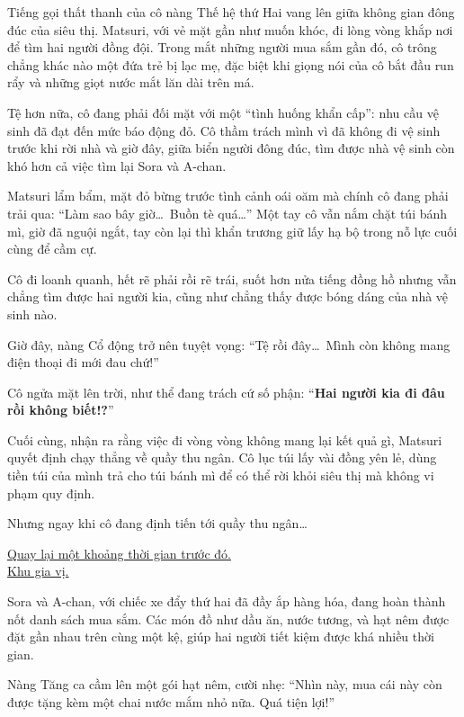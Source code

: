 \documentclass[../main.tex]{subfiles}
\begin{document}
Tiếng gọi thất thanh của cô nàng Thế hệ thứ Hai vang lên giữa không gian đông đúc của siêu thị. Matsuri, với vẻ mặt gần như muốn khóc, đi lòng vòng khắp nơi để tìm hai người đồng đội. Trong mắt những người mua sắm gần đó, cô trông chẳng khác nào một đứa trẻ bị lạc mẹ, đặc biệt khi giọng nói của cô bắt đầu run rẩy và những giọt nước mắt lăn dài trên má.

Tệ hơn nữa, cô đang phải đối mặt với một ``tình huống khẩn cấp'': nhu cầu vệ sinh đã đạt đến mức báo động đỏ. Cô thầm trách mình vì đã không đi vệ sinh trước khi rời nhà và giờ đây, giữa biển người đông đúc, tìm được nhà vệ sinh còn khó hơn cả việc tìm lại Sora và A-chan.

Matsuri lẩm bẩm, mặt đỏ bừng trước tình cảnh oái oăm mà chính cô đang phải trải qua: ``Làm sao bây giờ\dots\ Buồn tè quá\dots'' Một tay cô vẫn nắm chặt túi bánh mì, giờ đã nguội ngắt, tay còn lại thì khẩn trương giữ lấy hạ bộ trong nỗ lực cuối cùng để cầm cự.

Cô đi loanh quanh, hết rẽ phải rồi rẽ trái, suốt hơn nửa tiếng đồng hồ nhưng vẫn chẳng tìm được hai người kia, cũng như chẳng thấy được bóng dáng của nhà vệ sinh nào.

Giờ đây, nàng Cổ động trở nên tuyệt vọng: ``Tệ rồi đây\dots\ Mình còn không mang điện thoại đi mới đau chứ!''

Cô ngửa mặt lên trời, như thể đang trách cứ số phận: ``\textbf{Hai người kia đi đâu rồi không biết!?}''

Cuối cùng, nhận ra rằng việc đi vòng vòng không mang lại kết quả gì, Matsuri quyết định chạy thẳng về quầy thu ngân. Cô lục túi lấy vài đồng yên lẻ, dùng tiền túi của mình trả cho túi bánh mì để có thể rời khỏi siêu thị mà không vi phạm quy định.

Nhưng ngay khi cô đang định tiến tới quầy thu ngân\dots

\il

\begin{center}
    \uline{Quay lại một khoảng thời gian trước đó.\\Khu gia vị.}
\end{center}

Sora và A-chan, với chiếc xe đẩy thứ hai đã đầy ắp hàng hóa, đang hoàn thành nốt danh sách mua sắm. Các món đồ như dầu ăn, nước tương, và hạt nêm được đặt gần nhau trên cùng một kệ, giúp hai người tiết kiệm được khá nhiều thời gian.

Nàng Tăng ca cầm lên một gói hạt nêm, cười nhẹ: ``Nhìn này, mua cái này còn được tặng kèm một chai nước mắm nhỏ nữa. Quá tiện lợi!''
\end{document}
